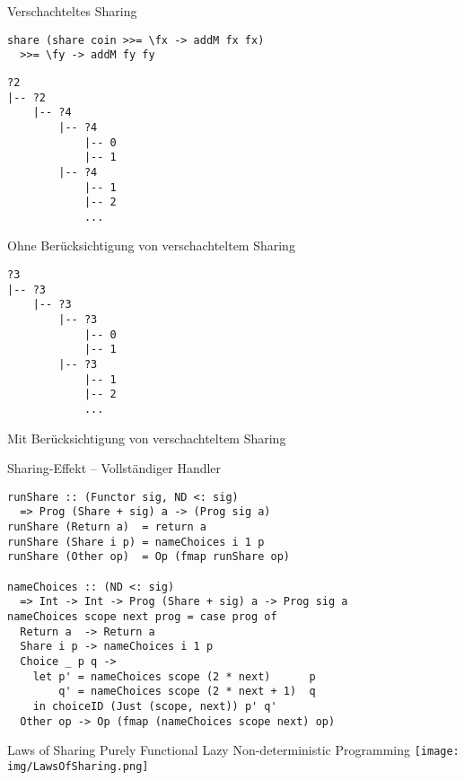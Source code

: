 \documentclass{beamer}
\begin{document}
\appendix

\begin{frame}[fragile]{Verschachteltes Sharing}

\begin{verbatim}
share (share coin >>= \fx -> addM fx fx)
  >>= \fy -> addM fy fy
\end{verbatim}

\begin{minipage}[t]{0.48\linewidth}
\begin{verbatim}
?2
|-- ?2
    |-- ?4
        |-- ?4
            |-- 0
            |-- 1
        |-- ?4
            |-- 1
            |-- 2
            ...
\end{verbatim}
{\tiny Ohne Berücksichtigung von verschachteltem Sharing}
\end{minipage}
\begin{minipage}[t]{0.48\linewidth}
\begin{verbatim}
?3
|-- ?3
    |-- ?3
        |-- ?3
            |-- 0
            |-- 1
        |-- ?3
            |-- 1
            |-- 2
            ...
\end{verbatim}
{\tiny Mit Berücksichtigung von verschachteltem Sharing}
\end{minipage}
\end{frame}

\begin{frame}[fragile]{Sharing-Effekt -- Vollständiger Handler}
\begin{verbatim}
runShare :: (Functor sig, ND <: sig) 
  => Prog (Share + sig) a -> (Prog sig a)
runShare (Return a)  = return a
runShare (Share i p) = nameChoices i 1 p
runShare (Other op)  = Op (fmap runShare op)

nameChoices :: (ND <: sig) 
  => Int -> Int -> Prog (Share + sig) a -> Prog sig a
nameChoices scope next prog = case prog of
  Return a  -> Return a
  Share i p -> nameChoices i 1 p
  Choice _ p q ->
    let p' = nameChoices scope (2 * next)      p
        q' = nameChoices scope (2 * next + 1)  q
    in choiceID (Just (scope, next)) p' q'
  Other op -> Op (fmap (nameChoices scope next) op)
\end{verbatim}
\end{frame}

\begin{frame}{Laws of Sharing}
Purely Functional Lazy Non-deterministic Programming
\texttt{[image: img/LawsOfSharing.png]}
\end{frame}
\end{document}
